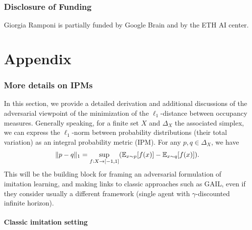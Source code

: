 \documentclass{article}
\begin{document}
\section*{Disclosure of Funding}
Giorgia Ramponi is partially funded by Google Brain and by the ETH AI center.

\newpage





\newpage
\appendix{}
\part{Appendix} %
\parttoc %



\section{More details on IPMs}\label{sec:ipm}

In this section, we provide a detailed derivation and additional discussions of the adversarial viewpoint of the minimization of the $\ell_1$-distance between occupancy measures. Generally speaking, for a finite set $X$ and $\Delta_X$ the associated simplex, we can express the $\ell_1$-norm between probability distributions (their total variation) as an integral probability metric (IPM). For any $p,q\in\Delta_X$, we have
\begin{equation}
    \|p-q\|_1 = \sup_{f:X\rightarrow[-1,1]} (\mathbb{E}_{x\sim p}[f(x)] - \mathbb{E}_{x\sim q}[f(x)]).
\end{equation}
This will be the building block for framing an adversarial formulation of imitation learning, and making links to classic approaches such as GAIL, even if they consider usually a different framework (single agent with $\gamma$-discounted infinite horizon).

\subsection{Classic imitation setting}
\end{document}

